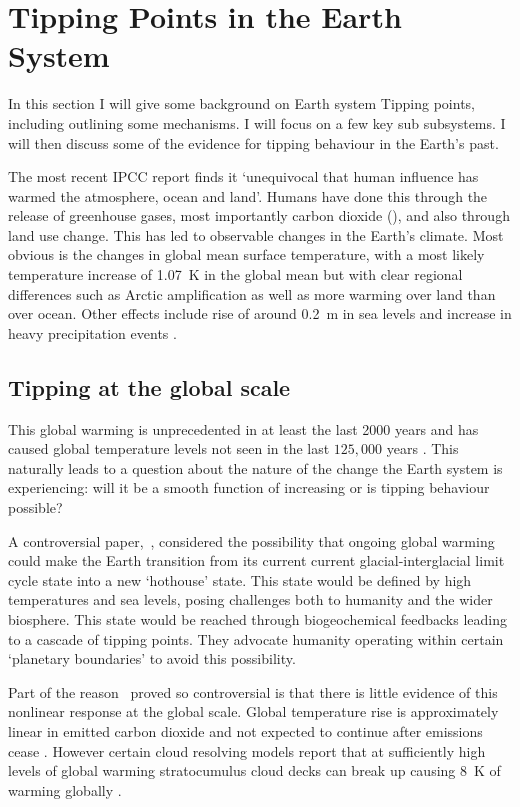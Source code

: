\section{Tipping Points in the Earth System}
In this section I will give some background on Earth system Tipping points, including outlining some mechanisms.
I will focus on a few key sub subsystems. I will then discuss some of the evidence for tipping behaviour in the Earth's past.

The most recent IPCC report \parencite{AR6} finds it `unequivocal that human influence has warmed the atmosphere, ocean and land'. Humans have done this through the release of greenhouse
gases, most importantly carbon dioxide (), and also through land use change. This has led to observable changes in the Earth's climate. Most obvious is the changes in global mean surface
temperature, with a most likely temperature increase of \SI{1.07}{\kelvin} \parencite{AR6} in the global mean but with clear regional differences \parencite{Morice2021} such as
Arctic amplification as well as more warming over land than over ocean. Other effects include rise of around \SI{0.2}{\meter} in sea levels \parencite{Frederikse2020} and increase in heavy precipitation
events \parencite{Fischer2016}.

\subsection{Tipping at the global scale}
This global warming is unprecedented in at least the last 2000 years and has caused global temperature levels not seen in the last $125,000$ years \parencite{AR6}. This naturally leads to a question
about the nature of the change the Earth system is experiencing: will it be a smooth function of increasing  or is tipping behaviour possible?

A controversial paper,~\cite{Steffen2018}, considered the possibility that ongoing global warming could make the Earth transition from its current current glacial-interglacial limit cycle
state into a new `hothouse' state. This state would be defined by high temperatures and sea levels, posing challenges both to humanity and the wider biosphere. This state would be reached
through biogeochemical feedbacks leading to a cascade of tipping points. They advocate humanity operating within certain `planetary boundaries' \parencite{Rockstrom2009} to avoid this possibility.

Part of the reason~\cite{Steffen2018} proved so controversial is that there is little evidence of this nonlinear response at the global scale. Global temperature rise is approximately linear
in emitted carbon dioxide \parencite{Allen2009,Rogelj2019} and not expected to continue after emissions cease \parencite{MacDougall2020}. However certain cloud resolving models
report that at sufficiently high levels of global warming stratocumulus cloud decks can break up causing \SI{8}{\kelvin} of warming globally \parencite{Schneider2019}.

